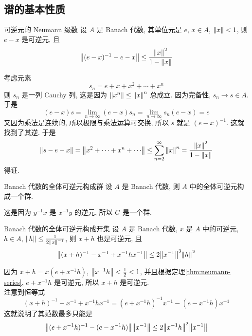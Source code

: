     \subsection{谱的基本性质}

        \begin{thm}
            {可逆元的 Neumann 级数}
            设 \(A\) 是 Banach 代数, 其单位元是 \(e\), \(x\in A\), \(\norm{x}<1\), 则 \(e-x\) 是可逆元, 且
            \[\norm{(e-x)^{-1}-e-x}\leq\frac{\norm{x}^2}{1-\norm{x}} \]
        \end{thm}

        \begin{prf}
            考虑元素
            \[s_n=e+x+x^2+\cdots+x^n\]
            则 \(s_n\) 是一列 Cauchy 列, 这是因为 \(\norm{x^n}\leq\norm{x}^n\) 总成立. 因为完备性, \(s_n\to s\in A\). 于是
            \[(e-x)s = \lim_{n\to\infty} (e-x)s_n = \lim_{n\to\infty} s_n(e-x) = e\]
            又因为乘法是连续的, 所以极限与乘法运算可交换, 所以 \(s\) 就是 \((e-x)^{-1}\). 这就找到了其逆. 于是
            \[\norm{s-e-x}=\norm{x^2+\cdots+x^n+\cdots}\leq\sum_{n=2}^{\infty} \norm{x}^n= \frac{\norm{x}^2}{1-\norm{x}} \]
            得证.
        \end{prf}

        \begin{thm}
            {Banach 代数的全体可逆元构成群}
            设 \(A\) 是 Banach 代数, 则 \(A\) 中的全体可逆元构成一个群.
        \end{thm}

        \begin{prf}
            这是因为 \(y^{-1}x\) 是 \(x^{-1}y\) 的逆元, 所以 \(G\) 是一个群.
        \end{prf}

        \begin{thm}
            {Banach 代数的全体可逆元构成开集}
            设 \(A\) 是 Banach 代数, \(x\) 是 \(A\) 中的可逆元, \(h\in A\), \(\norm{h}\leq\frac{1}{2\norm{x}^{-1}} \), 则 \(x+h\) 也是可逆元, 且
            \[\norm{(x+h)^{-1}-x^{-1}+x^{-1}hx^{-1}}\leq 2\norm{x^{-1}}^3\norm{h}^2 \]
        \end{thm}

        \begin{prf}
            因为 \(x+h=x(e+x^{-1}h)\), \(\norm{x^{-1}h}<\frac{1}{2}<1\), 并且根据定理\ref{thm:neumann-series}, \(e+x^{-1}h\) 是可逆元, 所以 \(x+h\) 是可逆元. \\
            注意到恒等式
            \[(x+h)^{-1}-x^{-1}+x^{-1}hx^{-1} = (e+x^{-1}h)^{-1}x^{-1}-(e-x^{-1}h)x^{-1}\]
            这就说明了其范数最多只能是
            \[\norm{(e+x^{-1}h)^{-1}-(e-x^{-1}h)}\norm{x^{-1}}\leq 2\norm{x^{-1}h}^2\norm{x^{-1}}\]
        \end{prf}

